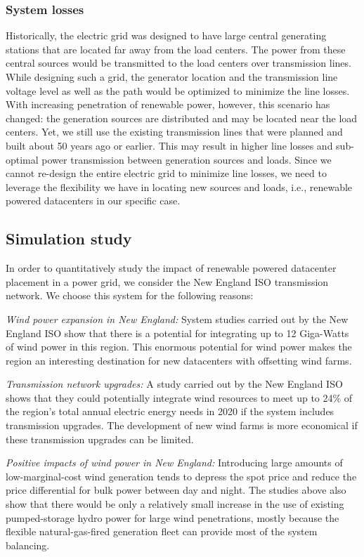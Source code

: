 \subsubsection{System losses}
Historically, the electric grid was designed to have large central
generating stations that are located far away from the load
centers. The power from these central sources would be transmitted to
the load centers over transmission lines. While designing such a grid,
the generator location and the transmission line voltage level as well
as the path would be optimized to minimize the line losses.  With
increasing penetration of renewable power, however, this scenario has
changed: the generation sources are distributed and may be located
near the load centers.  Yet, we still use the existing transmission
lines that were planned and built about 50 years ago or earlier.  This
may result in higher line losses and sub-optimal power transmission
between generation sources and loads. Since we cannot re-design the
entire electric grid to minimize line losses, we need to leverage the
flexibility we have in locating new sources and loads, i.e., renewable
powered datacenters in our specific case.


\subsection{Simulation study}
In order to quantitatively study the impact of renewable powered datacenter placement in a power grid, we consider the New England ISO transmission network. We choose this system for the following reasons:

{\em Wind power expansion in New England:} System studies carried out
by the New England ISO show that there is a potential for integrating
up to 12 Giga-Watts of wind power in this region.  This enormous
potential for wind power makes the region an interesting destination
for new datacenters with offsetting wind farms.

{\em Transmission network upgrades:} A study carried out by the New
England ISO shows that they could potentially integrate wind resources
to meet up to 24\% of the region's total annual electric energy needs
in 2020 if the system includes transmission upgrades.  The development
of new wind farms is more economical if these transmission upgrades
can be limited.

{\em Positive impacts of wind power in New England:} Introducing
large amounts of low-marginal-cost wind generation tends to depress
the spot price and reduce the price differential for bulk power
between day and night. The studies above also show that there would be
only a relatively small increase in the use of existing pumped-storage
hydro power for large wind penetrations, mostly because the flexible
natural-gas-fired generation fleet can provide most of the system
balancing.

